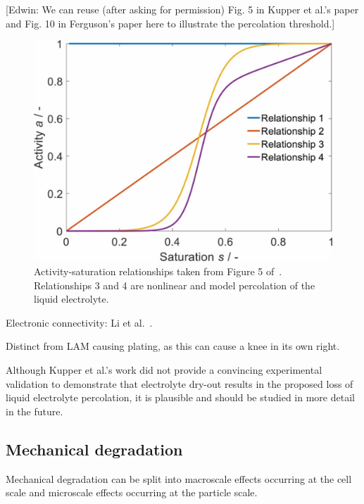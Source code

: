 \documentclass{article}
\begin{document}
[Edwin: We can reuse (after asking for permission) Fig. 5 in Kupper et al.'s paper and Fig. 10 in Ferguson's paper here to illustrate the percolation threshold.]

\begin{figure}[ht]
    \centering
    \includegraphics[scale=0.75]{figures/A3468fig5.jpeg}
    \caption{Activity-saturation relationships taken from Figure 5 of~\cite{kupper_end--life_2018}. Relationships 3 and 4 are nonlinear and model percolation of the liquid electrolyte.}
    \label{fig:activity-saturation-relationships}
\end{figure}

Electronic connectivity: Li et al.~\cite{li_effects_2015}.

Distinct from LAM causing plating, as this can cause a knee in its own right.

Although Kupper et al.'s work did not provide a convincing experimental validation to demonstrate that electrolyte dry-out results in the proposed loss of liquid electrolyte percolation, it is plausible and should be studied in more detail in the future. 

\subsection{Mechanical degradation}

Mechanical degradation can be split into macroscale effects occurring at the cell scale and microscale effects occurring at the particle scale.
\end{document}
